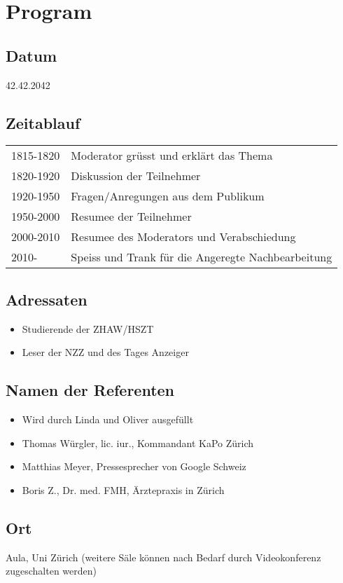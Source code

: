 \section{Program}
\subsection{Datum}
42.42.2042

\subsection{Zeitablauf}
\begin{tabular}{ll}
1815-1820 & Moderator grüsst und erklärt das Thema\\
1820-1920 & Diskussion der Teilnehmer\\
1920-1950 & Fragen/Anregungen aus dem Publikum\\
1950-2000 & Resumee der Teilnehmer\\
2000-2010 & Resumee des Moderators und Verabschiedung\\
2010-         & Speiss und Trank für die Angeregte Nachbearbeitung\\
\end{tabular}

\subsection{Adressaten}
\begin{itemize}
 \item Studierende der ZHAW/HSZT
 \item Leser der NZZ und des Tages Anzeiger
\end{itemize}


\subsection{Namen der Referenten}
\begin{itemize}
 \item Wird durch Linda und Oliver ausgefüllt
 \item Thomas Würgler, lic. iur., Kommandant KaPo Zürich
 \item Matthias Meyer, Pressesprecher von Google Schweiz
 \item Boris Z., Dr. med. FMH, Ärztepraxis in Zürich
\end{itemize}

\subsection{Ort}
Aula, Uni Zürich (weitere Säle können nach Bedarf durch Videokonferenz zugeschalten werden)


